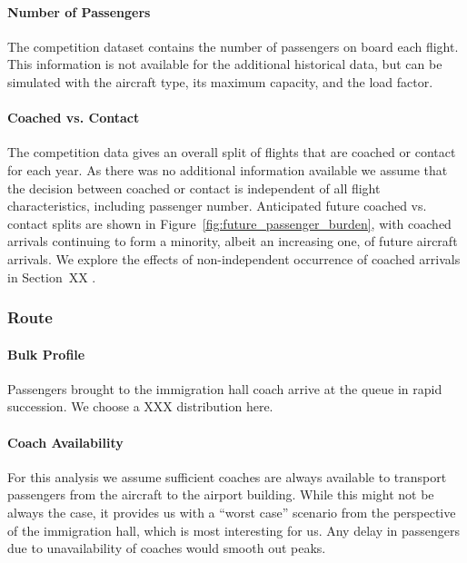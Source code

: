 \documentclass[10pt]{article}
\begin{document}
\paragraph{Number of Passengers}
The competition dataset contains the number of passengers on board each flight. This information is not available for the additional historical data, but can be simulated with the aircraft type, its maximum capacity, and the load factor. 

\paragraph{Coached vs. Contact}
The competition data gives an overall split of flights that are coached or contact for each year. As there was no additional information available we assume that the decision between coached or contact is independent of all flight characteristics, including passenger number. Anticipated future coached vs. contact splits are shown in Figure~\ref{fig:future_passenger_burden}, with coached arrivals continuing to form a minority, albeit an increasing one, of future aircraft arrivals. We explore the effects of non-independent occurrence of coached arrivals in Section~XX .


\subsubsection{Route}

\paragraph{Bulk Profile} 
 Passengers  brought to the immigration hall coach arrive at the queue in rapid succession. We choose a XXX distribution  here.

\paragraph{Coach Availability}
For this analysis we assume sufficient coaches are always available to transport passengers from the aircraft to the airport building. While this might not be always the case, it provides us with a ``worst case'' scenario from the perspective of the immigration hall, which is most interesting for us. Any delay in passengers due to unavailability of coaches would smooth out peaks. 
\end{document}
